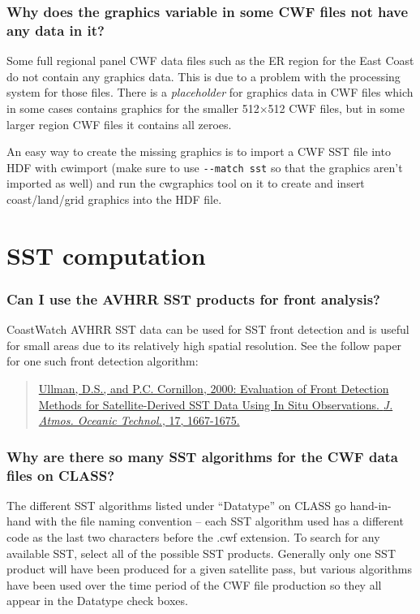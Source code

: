 \subsubsection*{Why does the graphics variable in some CWF files not have any data in it?}

Some full regional panel CWF data files such as the ER region for the
East Coast do not contain any graphics data.  This is due to a problem
with the processing system for those files.  There is a {\em
placeholder} for graphics data in CWF files which in some cases
contains graphics for the smaller 512$\times$512 CWF files, but in
some larger region CWF files it contains all zeroes.

An easy way to create the missing graphics is to import a CWF SST file
into HDF with cwimport (make sure to use \verb+--match sst+ so that
the graphics aren't imported as well) and run the cwgraphics tool on
it to create and insert coast/land/grid graphics into the HDF file.

\section{SST computation}

\subsubsection*{Can I use the AVHRR SST products for front analysis?}

CoastWatch AVHRR SST data can be used for SST front detection and is
useful for small areas due to its relatively high spatial resolution.
See the follow paper for one such front detection algorithm:
\begin{quote}
\href{http://ams.allenpress.com/perlserv/?request=get-abstract&doi=10.1175%2F1520-0426%282000%29017%3C1667%3AEOFDMF%3E2.0.CO%3B2}{Ullman,
D.S., and P.C. Cornillon, 2000: Evaluation of Front Detection Methods
for Satellite-Derived SST Data Using In Situ Observations. {\it
J. Atmos. Oceanic Technol.}, 17, 1667-1675.}
\end{quote}

\subsubsection*{Why are there so many SST algorithms for the CWF data 
files on CLASS?}

The different SST algorithms listed under ``Datatype'' on CLASS go
hand-in-hand with the file naming convention -- each SST algorithm
used has a different code as the last two characters before the {\file
.cwf} extension.  To search for any available SST, select all of the
possible SST products.  Generally only one SST product will have been
produced for a given satellite pass, but various algorithms have been
used over the time period of the CWF file production so they all
appear in the Datatype check boxes.

